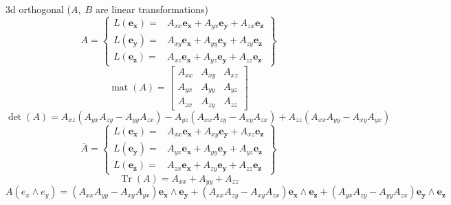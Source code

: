 \documentclass[10pt,fleqn]{report}
\DeclareMathOperator{\Tr}{Tr}
\newcommand{\lp}{\left (}
\newcommand{\rp}{\right )}
\newcommand{\W}{\wedge}
\newcommand{\f}[2]{{#1}\lp{#2}\rp}
\begin{document}
3d orthogonal ($A,\;B$ are linear transformations)
\begin{equation*} A = \left \{ \begin{array}{ll} L \left ( \boldsymbol{e_{x}}\right ) =& A_{xx} \boldsymbol{e_{x}} + A_{yx} \boldsymbol{e_{y}} + A_{zx} \boldsymbol{e_{z}} \\ L \left ( \boldsymbol{e_{y}}\right ) =& A_{xy} \boldsymbol{e_{x}} + A_{yy} \boldsymbol{e_{y}} + A_{zy} \boldsymbol{e_{z}} \\ L \left ( \boldsymbol{e_{z}}\right ) =& A_{xz} \boldsymbol{e_{x}} + A_{yz} \boldsymbol{e_{y}} + A_{zz} \boldsymbol{e_{z}}  \end{array} \right \} \end{equation*}
\begin{equation*} \f{\operatorname{mat}}{A} = \left[\begin{matrix}A_{xx} & A_{xy} & A_{xz}\\A_{yx} & A_{yy} & A_{yz}\\A_{zx} & A_{zy} & A_{zz}\end{matrix}\right] \end{equation*}
\begin{equation*} \f{\det}{A} = A_{xz} \left(A_{yx} A_{zy} - A_{yy} A_{zx}\right) - A_{yz} \left(A_{xx} A_{zy} - A_{xy} A_{zx}\right) + A_{zz} \left(A_{xx} A_{yy} - A_{xy} A_{yx}\right) \end{equation*}
\begin{equation*} \overline{A} = \left \{ \begin{array}{ll} L \left ( \boldsymbol{e_{x}}\right ) =& A_{xx} \boldsymbol{e_{x}} + A_{xy} \boldsymbol{e_{y}} + A_{xz} \boldsymbol{e_{z}} \\ L \left ( \boldsymbol{e_{y}}\right ) =& A_{yx} \boldsymbol{e_{x}} + A_{yy} \boldsymbol{e_{y}} + A_{yz} \boldsymbol{e_{z}} \\ L \left ( \boldsymbol{e_{z}}\right ) =& A_{zx} \boldsymbol{e_{x}} + A_{zy} \boldsymbol{e_{y}} + A_{zz} \boldsymbol{e_{z}}  \end{array} \right \} \end{equation*}
\begin{equation*} \f{\Tr}{A} = A_{xx} + A_{yy} + A_{zz} \end{equation*}
\begin{equation*} \f{A}{e_x\W e_y} = \left ( A_{xx} A_{yy} - A_{xy} A_{yx}\right ) \boldsymbol{e_{x}\wedge e_{y}} + \left ( A_{xx} A_{zy} - A_{xy} A_{zx}\right ) \boldsymbol{e_{x}\wedge e_{z}} + \left ( A_{yx} A_{zy} - A_{yy} A_{zx}\right ) \boldsymbol{e_{y}\wedge e_{z}} \end{equation*}
\end{document}
